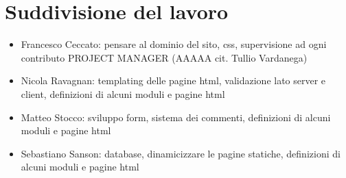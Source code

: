 \section{Suddivisione del lavoro}
\label{sec:organization}

\begin{itemize}
    \item Francesco Ceccato: pensare al dominio del sito, css, supervisione ad ogni contributo PROJECT MANAGER (AAAAA cit. Tullio Vardanega)
    \item Nicola Ravagnan: templating delle pagine html, validazione lato server e client, definizioni di alcuni moduli e pagine html
    \item Matteo Stocco: sviluppo form, sistema dei commenti, definizioni di alcuni moduli e pagine html
    \item Sebastiano Sanson: database, dinamicizzare le pagine statiche, definizioni di alcuni moduli e pagine html
\end{itemize}